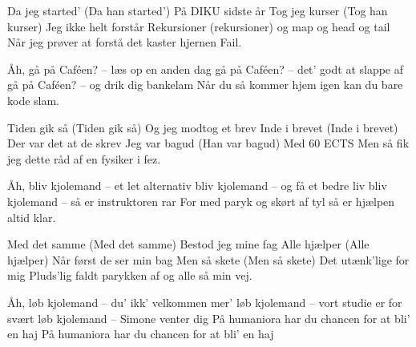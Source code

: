 \documentclass[a4paper,11pt]{article}
\begin{document}
\begin{song}

Da jeg started' (Da han started')
På DIKU sidste år
Tog jeg kurser (Tog han kurser)
Jeg ikke helt forstår
Rekursioner (rekursioner)
og map og head og tail
Når jeg prøver at forstå det kaster hjernen Fail.


Åh, gå på Caféen? -- læs op en anden dag
gå på Caféen? -- det' godt at slappe af
gå på Caféen? -- og drik dig bankelam
Når du så kommer hjem igen kan du bare kode slam.


Tiden gik så (Tiden gik så)
Og jeg modtog et brev
Inde i brevet (Inde i brevet)
Der var det at de skrev
Jeg var bagud (Han var bagud)
Med 60 ECTS
Men så fik jeg dette råd af en fysiker i fez.

 
Åh, bliv kjolemand -- et let alternativ
bliv kjolemand -- og få et bedre liv
bliv kjolemand -- så er instruktoren rar
For med paryk og skørt af tyl så er hjælpen altid klar.


Med det samme (Med det samme)
Bestod jeg mine fag
Alle hjælper (Alle hjælper)
Når først de ser min bag 
Men så skete (Men så skete)
Det utænk'lige for mig
Pluds'lig faldt parykken af og alle så min vej.


Åh, løb kjolemand -- du' ikk' velkommen mer'
løb kjolemand -- vort studie er for svært
løb kjolemand -- Simone venter dig
På humaniora har du chancen for at bli' en haj
På humaniora har du chancen for at bli' en haj


\end{song}
\end{document}
